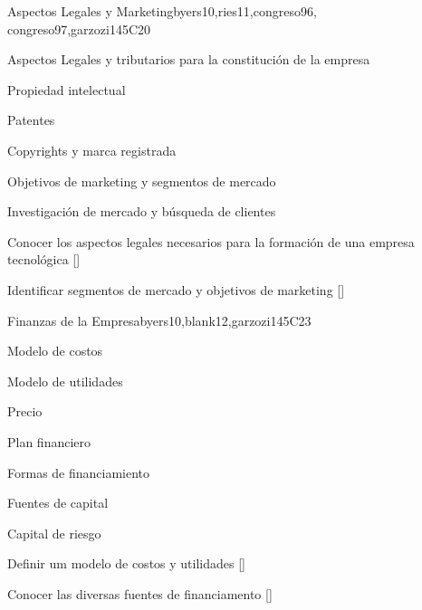 \begin{syllabus}
   \begin{unit}{}{Aspectos Legales y Marketing}{byers10,ries11,congreso96, congreso97,garzozi14}{5}{C20}
      \begin{topics}
        \item Aspectos Legales y tributarios para la constitución de la empresa
         \item Propiedad intelectual
         \item Patentes
         \item Copyrights y marca registrada
         \item Objetivos de marketing  y segmentos de mercado
         \item Investigación de mercado y búsqueda de clientes
      \end{topics}
   
     \begin{learningoutcomes} 
         \item Conocer los aspectos legales necesarios para la formación de una empresa tecnológica  [\Familiarity]
         \item Identificar segmentos de mercado y objetivos de marketing     [\Familiarity]
      \end{learningoutcomes} 
   \end{unit}
   
   \begin{unit}{}{Finanzas de la Empresa}{byers10,blank12,garzozi14}{5}{C23}
      \begin{topics}
         \item Modelo de costos
         \item Modelo de utilidades
         \item Precio
         \item Plan financiero
         \item Formas de financiamiento
         \item Fuentes de capital
         \item Capital de riesgo
      \end{topics}
   
      \begin{learningoutcomes} 
         \item Definir um modelo de costos y utilidades  [\Assessment]
         \item Conocer las diversas fuentes de financiamento  [\Familiarity]
      \end{learningoutcomes} 
   \end{unit}
   

\end{syllabus}
